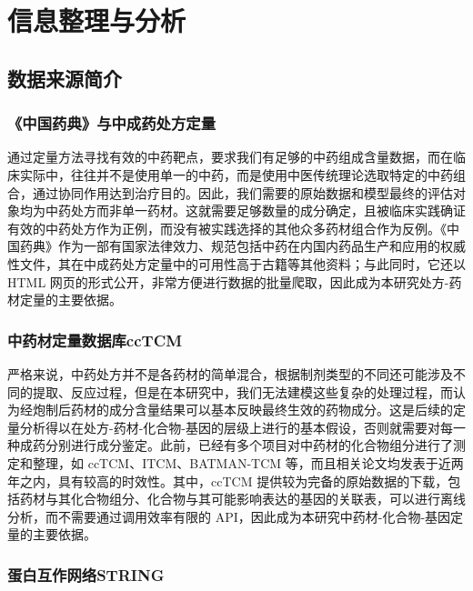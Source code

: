
\chapter{信息整理与分析}

\section{数据来源简介}

\subsection{《中国药典》与中成药处方定量}

通过定量方法寻找有效的中药靶点，要求我们有足够的中药组成含量数据，而在临床实际中，往往并不是使用单一的中药，而是使用中医传统理论选取特定的中药组合，通过协同作用达到治疗目的。因此，我们需要的原始数据和模型最终的评估对象均为中药处方而非单一药材。这就需要足够数量的成分确定，且被临床实践确证有效的中药处方作为正例，而没有被实践选择的其他众多药材组合作为反例。《中国药典》作为一部有国家法律效力、规范包括中药在内国内药品生产和应用的权威性文件，其在中成药处方定量中的可用性高于古籍等其他资料；与此同时，它还以 HTML 网页的形式公开，非常方便进行数据的批量爬取，因此成为本研究处方-药材定量的主要依据\cite{2020-ie}。

\subsection{中药材定量数据库ccTCM}

严格来说，中药处方并不是各药材的简单混合，根据制剂类型的不同还可能涉及不同的提取、反应过程，但是在本研究中，我们无法建模这些复杂的处理过程，而认为经炮制后药材的成分含量结果可以基本反映最终生效的药物成分。这是后续的定量分析得以在处方-药材-化合物-基因的层级上进行的基本假设，否则就需要对每一种成药分别进行成分鉴定。此前，已经有多个项目对中药材的化合物组分进行了测定和整理，如 ccTCM\cite{Yang_Zhu_Yao_Chen_Chen_Gu_Jiang_Chen_Zhang_Wu_et_al._2023}、ITCM\cite{Tian_Zhang_Yuan_Wang_Lv_Wang_Fang_Fu_Yang_Zu_et_al._2023}、BATMAN-TCM\cite{Kong_Liu_Zhang_Cheng_Mei_Li_Liu_Diao_Ma_Jiang_et_al._2024} 等，而且相关论文均发表于近两年之内，具有较高的时效性。其中，ccTCM 提供较为完备的原始数据的下载，包括药材与其化合物组分、化合物与其可能影响表达的基因的关联表，可以进行离线分析，而不需要通过调用效率有限的 API，因此成为本研究中药材-化合物-基因定量的主要依据。

\subsection{蛋白互作网络STRING}


